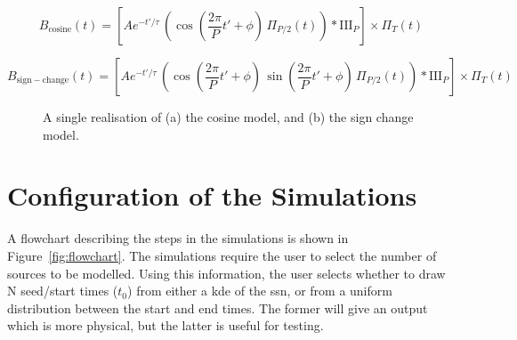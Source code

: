 \begin{equation}
B_{\mathrm{cosine}}(t) = \left[ A e^{-t'/\tau} \, \left( \cos{\left(\frac{2\pi}{P}t' + \phi\right)} \, \Pi_{P/2}(t) \right) * \mathrm{III}_{P} \right] \times \Pi_{T}(t)
\label{eq:cosine_model}
\end{equation}


\begin{equation}
B_{\mathrm{sign-change}}(t) = \left[ A e^{-t'/\tau} \, \left( \cos{\left(\frac{2\pi}{P}t' + \phi\right)} \, \sin{\left(\frac{2\pi}{P}t' + \phi\right)} \, \Pi_{P/2}(t) \right) * \mathrm{III}_{P} \right] \times \Pi_{T}(t)
\label{eq:sgn_cng_model}
\end{equation}


\begin{figure}[ht!]
	\centering
	\qquad
	\caption{A single realisation of (a) the cosine model, and (b) the sign change model.}  
	\label{fig:artificial_TS}
\end{figure}


\section{Configuration of the Simulations}

A flowchart describing the steps in the simulations is shown in Figure~\ref{fig:flowchart}. The simulations require the user to select the number of sources to be modelled. Using this information, the user selects whether to draw N seed/start times ($t_0$) from either a \gls{kde} of the \gls{ssn}, or from a uniform distribution between the start and end times. The former will give an output which is more physical, but the latter is useful for testing.


